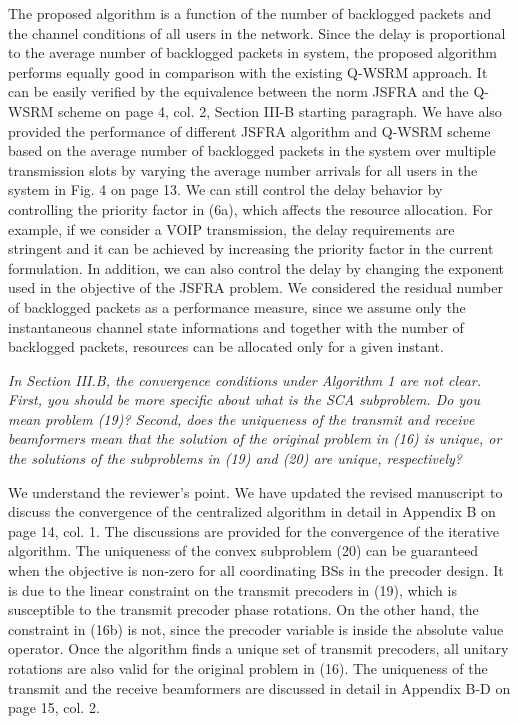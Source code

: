 \begin{itemize}
\resp The proposed algorithm is a function of the number of backlogged packets and the channel conditions of all users in the network. Since the delay is proportional to the average number of backlogged packets in system, the proposed algorithm performs equally good in comparison with the existing Q-WSRM approach. It can be easily verified by the equivalence between the  norm JSFRA and the Q-WSRM scheme on page 4, col. 2, Section III-B starting paragraph. We have also provided the performance of different JSFRA algorithm and Q-WSRM scheme based on the average number of backlogged packets in the system over multiple transmission slots by varying the average number arrivals for all users in the system in Fig. 4 on page 13. We can still control the delay behavior by controlling the priority factor  in (6a), which affects the resource allocation. For example, if we consider a VOIP transmission, the delay requirements are stringent and it can be achieved by increasing the priority factor  in the current formulation. In addition, we can also control the delay by changing the exponent used in the objective  of the JSFRA problem. We considered the residual number of backlogged packets as a performance measure, since we assume only the instantaneous channel state informations and together with the number of backlogged packets, resources can be allocated only for a given instant.

 \textit{In Section III.B, the convergence conditions under Algorithm 1 are not clear. First, you should be more specific about what is the SCA subproblem. Do you mean problem (19)? Second, does the uniqueness of the transmit and receive beamformers mean that the solution of the original problem in (16) is unique, or the solutions of the subproblems in (19) and (20) are unique, respectively?}

\resp We understand the reviewer's point. We have updated the revised manuscript to discuss the convergence of the centralized algorithm in detail in Appendix B on page 14, col. 1. The discussions are provided for the convergence of the iterative algorithm. The uniqueness of the convex subproblem (20) can be guaranteed when the objective is non-zero for all coordinating BSs in the precoder design. It is due to the linear constraint on the transmit precoders in (19), which is susceptible to the transmit precoder phase rotations. On the other hand, the constraint in (16b) is not, since the precoder variable is inside the absolute value operator. Once the algorithm finds a unique set of transmit precoders, all unitary rotations are also valid for the original problem in (16). The uniqueness of the transmit and the receive beamformers are discussed in detail in Appendix B-D on page 15, col. 2.


\end{itemize}
